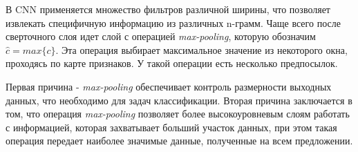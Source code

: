 В CNN применяется множество фильтров различной ширины, что позволяет извлекать специфичную информацию из различных n-грамм. Чаще всего после сверточного слоя идет слой с операцией \emph{max-pooling}, которую обозначим $\hat{c} = max\{c\}$. Эта операция выбирает максимальное значение из некоторого окна, проходясь по карте признаков. У такой операции есть несколько предпосылок.

Первая причина -  \emph{max-pooling} обеспечивает контроль размерности выходных данных, что необходимо для задач классификации. Вторая причина заключается в том, что операция  \emph{max-pooling} позволяет более высокоуровневым слоям работать с информацией, которая захватывает больший участок данных, при этом такая операция передает наиболее значимые данные, полученные на всем предложении. 


%
%
%
%
%
%
